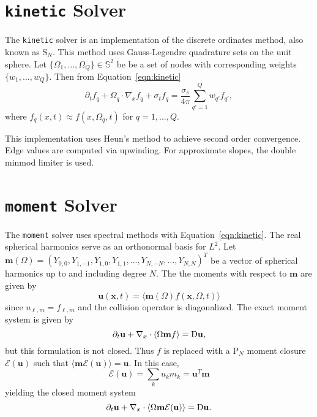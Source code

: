\documentclass{article}
\newcommand{\integral}[1]{\ensuremath{\langle #1 \rangle}}
\newcommand{\closure}[1]{\ensuremath{\mathcal{E}(#1)}}
\newcommand{\twosphere}{\ensuremath{\mathbb{S}^2}\xspace}
\newcommand{\kinetic}{\texttt{kinetic}\xspace}
\newcommand{\moment}{\texttt{moment}\xspace}
\begin{document}
\section{\kinetic Solver}
The \kinetic solver is an implementation of the discrete ordinates method, also known
as $\mathrm{S}_N$.
This method uses Gauss-Legendre quadrature sets on the unit sphere. Let
$\{\Omega_1, \dots, \Omega_Q\} \in \twosphere$ be be a set of nodes with
corresponding weights $\{w_1, \dots, w_Q\}$. Then from Equation~\ref{eqn:kinetic}
\begin{equation}
    \partial_t f_q + \Omega_q \cdot \nabla_x f_q + \sigma_t f_q=
    \frac{\sigma_s}{4\pi} \sum_{q'=1}^Q w_{q'} f_{q'},
\end{equation}
where $f_q(x,t) \approx f(x, \Omega_q, t)$ for $q = 1, \dots, Q$.

This implementation uses Heun's method to achieve second order convergence. Edge values
are computed via upwinding. For approximate slopes, the double minmod limiter is used.
\section{\moment Solver}
The \moment solver uses spectral methods with Equation~\ref{eqn:kinetic}. The real
spherical harmonics serve as an orthonormal basis for $L^2$. Let
$\mathbf{m}(\Omega) =
(Y_{0,0}, Y_{1,-1}, Y_{1,0}, Y_{1,1}, \dots, Y_{N,-N}, \dots, Y_{N,N})^T$
be a vector of spherical harmonics up to and including degree $N$. The the moments
with respect to $\mathbf{m}$ are given by
\begin{equation}
    \mathbf{u}(\mathbf{x}, t) =
    \integral{\mathbf{m}(\Omega) f(\mathbf{x}, \Omega, t)}
\end{equation}
since $u_{\ell,m} = f_{\ell,m}$ and the collision operator is diagonalized.
The exact moment system is given by
\begin{equation}
    \partial_t \mathbf{u} + \nabla_x \cdot \integral{\Omega\mathbf{m}f} =
    \Dif \mathbf{u},
\end{equation}
but this formulation is not closed. Thus $f$ is replaced with a $\mathrm{P}_N$
moment closure $\closure{\mathbf{u}}$ such that
$\integral{\mathbf{m}\closure{\mathbf{u}}} = \mathbf{u}$. In this case,
\begin{equation}
    \closure{\mathbf{u}} = \sum_k u_k m_k = \mathbf{u}^T \mathbf{m}
\end{equation}
yielding the closed moment system
\begin{equation}
    \partial_t \mathbf{u} + \nabla_x \cdot
    \integral{\Omega\mathbf{m}\closure{\mathbf{u}}} = \Dif \mathbf{u}.
\end{equation}
\end{document}
